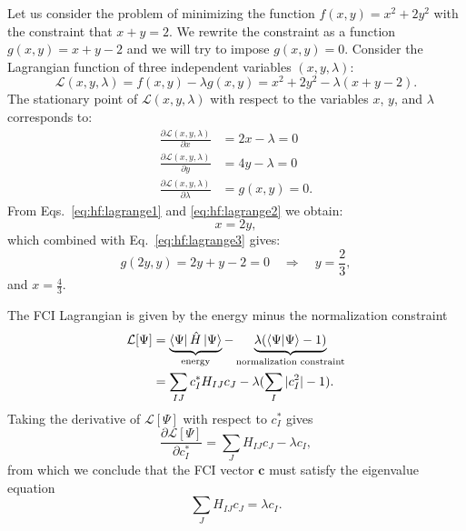 \documentclass[../Main/chem532-notes.tex]{subfiles}
\begin{document}
\begin{example}
Let us consider the problem of minimizing the function $f(x,y) = x^2 + 2 y^2$ with the constraint that $x + y = 2$.
We rewrite the constraint as a function $g(x,y) = x + y - 2$ and we will try to impose $g(x,y) = 0$.
Consider the Lagrangian function of three independent variables $(x,y,\lambda)$:
\begin{equation}
\mathcal{L}(x,y,\lambda) = f(x,y) - \lambda g(x,y) =  x^2 + 2 y^2 - \lambda (x + y - 2).
\end{equation}
The stationary point of $\mathcal{L}(x,y,\lambda)$ with respect to the variables $x$, $y$, and $\lambda$ corresponds to:
\begin{align}
\frac{\partial \mathcal{L}(x,y,\lambda)}{\partial x} &= 2 x - \lambda = 0 \label{eq:hf:lagrange1}\\
\frac{\partial \mathcal{L}(x,y,\lambda)}{\partial y} &= 4 y - \lambda = 0 \label{eq:hf:lagrange2}\\
\frac{\partial \mathcal{L}(x,y,\lambda)}{\partial \lambda} &= g(x,y)  = 0.\label{eq:hf:lagrange3}
\end{align}
From Eqs.~\eqref{eq:hf:lagrange1} and \eqref{eq:hf:lagrange2} we obtain:
\begin{equation}
x = 2y,
\end{equation}
which combined with Eq.~\eqref{eq:hf:lagrange3} gives: 
\begin{equation}
g(2y,y)  = 2y + y - 2 = 0 \quad \Rightarrow \quad y = \frac{2}{3},
\end{equation}
and $x = \frac{4}{3}$.
\end{example}

The FCI Lagrangian is given by the energy minus the normalization constraint
\begin{equation}
\begin{split}
\mathcal{L}[\Psi] & = \underbrace{\bra{\Psi} \hat{H} \ket{\Psi}}_{\text{energy}} - \underbrace{\lambda (\braket{\Psi|\Psi} - 1)}_{\text{normalization constraint}} \\
& = \sum_{IJ} c_I^{*} H_{IJ} c_J - \lambda (\sum_{I} |c_I^2| - 1).
\end{split}
\end{equation}
Taking the derivative of $\mathcal{L}[\Psi]$ with respect to $c_I^{*}$ gives
\begin{equation}
\frac{\partial \mathcal{L}[\Psi] }{\partial c_I^{*}} = \sum_{J} H_{IJ} c_J - \lambda c_I,
\end{equation}
from which we conclude that the FCI vector $\mathbf{c}$ must satisfy the eigenvalue equation
\begin{equation}
\sum_{J} H_{IJ} c_J = \lambda c_I.
\end{equation}
\end{document}
